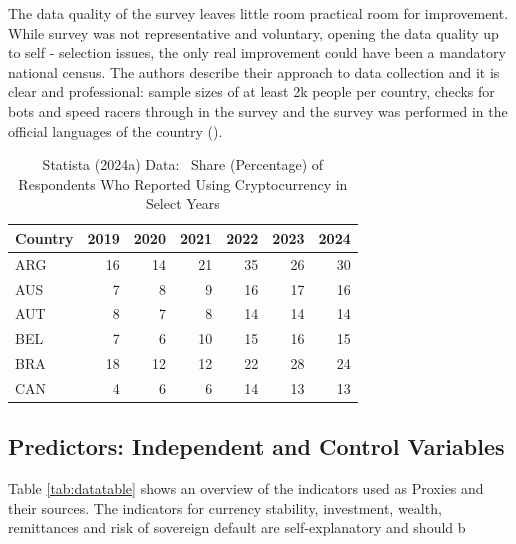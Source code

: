 \documentclass[
]{article}
\begin{document}
The data quality of the survey leaves little room practical room for improvement. While survey was not representative and voluntary, opening the data quality up to self - selection issues, the only real improvement could have been a mandatory national census. The authors describe their approach to data collection and it is clear and professional: sample sizes of at least 2k people per country, checks for bots and speed racers through in the survey and the survey was performed in the official languages of the country ().

\begin{table}[!h]
\centering
\caption{\label{tab:Adoption}Statista (2024a) Data: \ Share (Percentage) of Respondents Who Reported Using Cryptocurrency in Select Years}
\centering
\begin{tabular}[t]{l|r|r|r|r|r|r}
\hline
Country & 2019 & 2020 & 2021 & 2022 & 2023 & 2024\\
\hline
ARG & 16 & 14 & 21 & 35 & 26 & 30\\
\hline
AUS & 7 & 8 & 9 & 16 & 17 & 16\\
\hline
AUT & 8 & 7 & 8 & 14 & 14 & 14\\
\hline
BEL & 7 & 6 & 10 & 15 & 16 & 15\\
\hline
BRA & 18 & 12 & 12 & 22 & 28 & 24\\
\hline
CAN & 4 & 6 & 6 & 14 & 13 & 13\\
\hline
\end{tabular}
\end{table}

\subsection{Predictors: Independent and Control Variables}\label{predictors-independent-and-control-variables}

Table \ref{tab:datatable} shows an overview of the indicators used as Proxies and their sources. The indicators for currency stability, investment, wealth, remittances and risk of sovereign default are self-explanatory and should b
\end{document}
